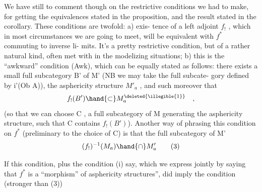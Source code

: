 We have still to comment though on the restrictive conditions we had
to make, for getting the equivalences stated in the proposition, and the
result stated in the corollary. These conditions are twofold: a) exis-%
tence of a left adjoint $f_{!}$ , which  in most circumstances we are going
to meet, will  be equivalent with $f^{*}$ commuting to inverse li-%
mits. It's a pretty restrictive condition, but of a rather natural kind,
often met with in the modelizing situations; b) this is the ``awkward''
condition (Awk), which can be equally stated as follows: there exists
a  small full subcategory B' of M' (NB we may take the full subcate-%
gory defined by i'(Ob A)), \hand{\uline{\textcolor{black}{generating}}} the asphericity structure $M'_{a}$ ,
and such moreover that
\[ f_{!}(B') \hand{\subset} M_a^{\deleted{\illegible{1}}} \quad , \]
(so that we can choose C , a  full subcategory of M generating
the asphericity structure, such that C contains $f_{!}(B')$). Another way of
phrasing this condition on $f^{*}$ (preliminary to the choice of C) is
that the full subcategory of M'
\[ (f_{!})^{-1}(M_{a}) \hand{\cap} M'_{a} \tag{3} \]

If this condition, plus the condition (i) say, which we express
jointly by saying that $f^{*}$ is a ``morphism'' of asphericity structures'', did
imply the condition (stronger than (3))

